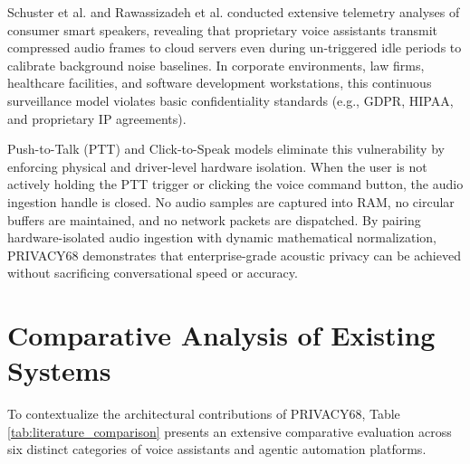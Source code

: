 Schuster et al. \cite{schuster2018speech} and Rawassizadeh et al. \cite{rawassizadeh2015smart} conducted extensive telemetry analyses of consumer smart speakers, revealing that proprietary voice assistants transmit compressed audio frames to cloud servers even during un-triggered idle periods to calibrate background noise baselines. In corporate environments, law firms, healthcare facilities, and software development workstations, this continuous surveillance model violates basic confidentiality standards (e.g., GDPR, HIPAA, and proprietary IP agreements).

Push-to-Talk (PTT) and Click-to-Speak models eliminate this vulnerability by enforcing physical and driver-level hardware isolation. When the user is not actively holding the PTT trigger or clicking the voice command button, the audio ingestion handle is closed. No audio samples are captured into RAM, no circular buffers are maintained, and no network packets are dispatched. By pairing hardware-isolated audio ingestion with dynamic mathematical normalization, PRIVACY68 demonstrates that enterprise-grade acoustic privacy can be achieved without sacrificing conversational speed or accuracy.

\section{Comparative Analysis of Existing Systems}
To contextualize the architectural contributions of PRIVACY68, Table \ref{tab:literature_comparison} presents an extensive comparative evaluation across six distinct categories of voice assistants and agentic automation platforms.

